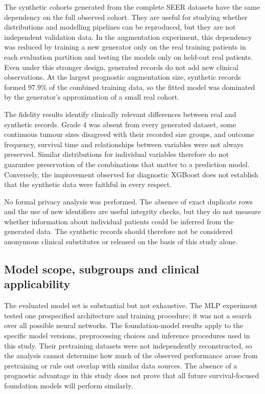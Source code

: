 The synthetic cohorts generated from the complete SEER datasets have the same
dependency on the full observed cohort. They are useful for studying whether
distributions and modelling pipelines can be reproduced, but they are not
independent validation data. In the augmentation experiment, this dependency
was reduced by training a new generator only on the real training patients in
each evaluation partition and testing the models only on held-out real
patients. Even under this stronger design, generated records do not add new
clinical observations. At the largest prognostic augmentation size, synthetic
records formed 97.9\% of the combined training data, so the fitted model was
dominated by the generator's approximation of a small real cohort.

The fidelity results identify clinically relevant differences between real and
synthetic records. Grade 4 was absent from every generated dataset, some
continuous tumour sizes disagreed with their recorded size groups, and outcome
frequency, survival time and relationships between variables were not always
preserved. Similar distributions for individual variables therefore do not
guarantee preservation of the combinations that matter to a prediction model.
Conversely, the improvement observed for diagnostic XGBoost does not establish
that the synthetic data were faithful in every respect.

No formal privacy analysis was performed. The absence of exact duplicate rows
and the use of new identifiers are useful integrity checks, but they do not
measure whether information about individual patients could be inferred from
the generated data. The synthetic records should therefore not be considered
anonymous clinical substitutes or released on the basis of this study alone.

\subsection{Model scope, subgroups and clinical applicability}

The evaluated model set is substantial but not exhaustive. The MLP experiment
tested one prespecified architecture and training procedure; it was not a search
over all possible neural networks. The foundation-model results apply to the
specific model versions, preprocessing choices and inference procedures used in
this study. Their pretraining datasets were not independently reconstructed, so
the analysis cannot determine how much of the observed performance arose from
pretraining or rule out overlap with similar data sources. The absence of a
prognostic advantage in this study does not prove that all future
survival-focused foundation models will perform similarly.


